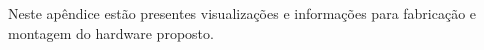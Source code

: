 \label{ap:B}

Neste apêndice estão presentes visualizações e informações para fabricação e montagem do hardware proposto.






% 







